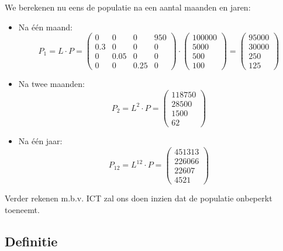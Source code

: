 \documentclass[12pt,twoside]{article}
\begin{document}
We berekenen nu eens de populatie na een aantal maanden en jaren:


\begin{itemize}
\item Na één maand:
  \[P_1 = L \cdot P =
    \begin{pmatrix}
      0 & 0 & 0 & 950 \\
      0.3 & 0 & 0 & 0 \\
      0 & 0.05 & 0 & 0 \\
      0 & 0 & 0.25 & 0
    \end{pmatrix}
    \cdot
    \begin{pmatrix}100000\\5000\\500\\100\end{pmatrix}
    =
    \begin{pmatrix}95000\\30000\\250\\125\end{pmatrix}\]
\item Na twee maanden:
  \[P_2 = L^2 \cdot P = \begin{pmatrix}118750\\28500\\1500\\62\end{pmatrix}\]
\item Na één jaar:
  \[P_{12} = L^{12} \cdot P = \begin{pmatrix}451313\\226066\\22607\\4521\end{pmatrix}\]
\end{itemize}

Verder rekenen m.b.v. ICT zal ons doen inzien dat de populatie onbeperkt toeneemt.

\subsection{Definitie}
\end{document}
